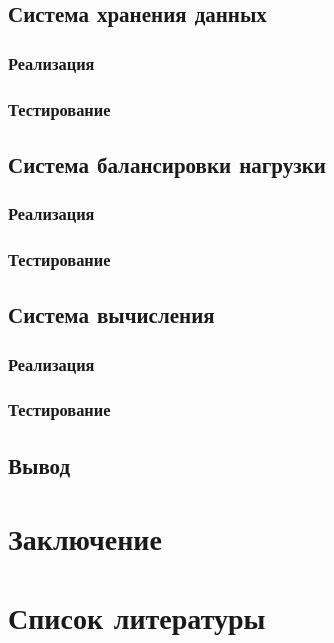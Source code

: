 \documentclass[a4paper,12pt]{report}
\numberwithin{equation}{section}
\begin{document}
  \subsection{Система хранения данных}
  \subsubsection{Реализация}
  
  \subsubsection{Тестирование}
  
  \subsection{Система балансировки нагрузки}
  \subsubsection{Реализация}
  
  \subsubsection{Тестирование}
  
  \subsection{Система вычисления}
  \subsubsection{Реализация}
  
  \subsubsection{Тестирование}
  
  \subsection{Вывод}
  
  \clearpage
  \section{Заключение}
  
  \section{Список литературы}
  \printbibliography[heading=none]
  
\end{document}
